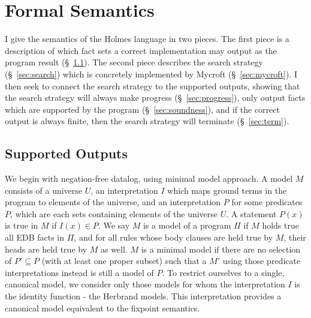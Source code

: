 \section{Formal Semantics}
I give the semantics of the Holmes language in two pieces.
The first piece is a description of which fact sets a correct implementation may output as the program result (\S~\ref{sec:allowed}).
The second piece describes the search strategy (\S~\ref{sec:search}) which is concretely implemented by Mycroft (\S~\ref{sec:mycroft}).
I then seek to connect the search strategy to the supported outputs, showing that the search strategy will always make progress (\S~\ref{sec:progress}), only output facts which are supported by the program (\S~\ref{sec:soundness}), and if the correct output is always finite, then the search strategy will terminate (\S~\ref{sec:term}).
\subsection{Supported Outputs}
\label{sec:allowed}
We begin with negation-free datalog, using minimal model approach.
A model $M$ consists of a universe $U$, an interpretation $I$ which maps ground terms in the program to elements of the universe, and an interpretation $P$ for some predicates $P$, which are each sets containing elements of the universe $U$.
A statement $P(x)$ is true in $M$ if $I(x) \in P$.
We say $M$ is a model of a program $\Pi$ if $M$ holds true all EDB facts in $\Pi$, and for all rules whose body clauses are held true by $M$, their heads are held true by $M$ as well.
$M$ is a minimal model if there are no selection of $P' \subseteq P$ (with at least one proper subset) such that a $M'$ using those predicate interpretations instead is still a model of $P$.
To restrict ourselves to a single, canonical model, we consider only those models for whom the interpretation $I$ is the identity function - the Herbrand models.
This interpretation provides a canonical model equivalent to the fixpoint semantics.

